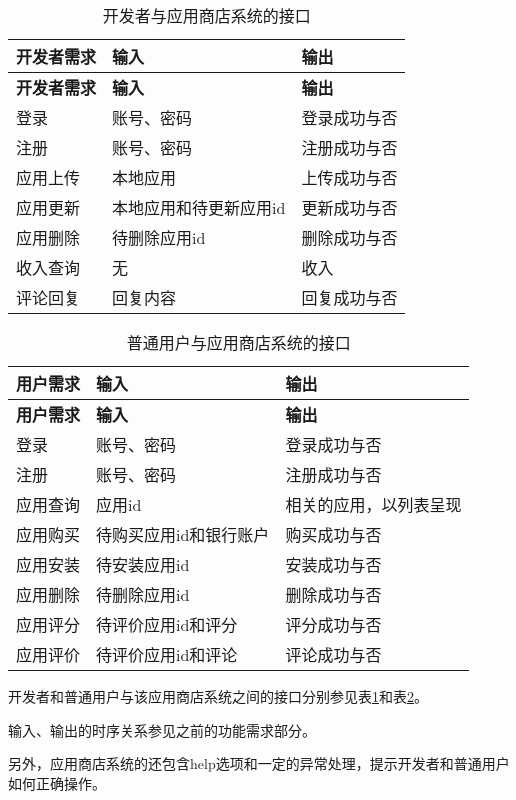 \begin{longtable}{|p{4cm}|p{7cm}|p{7cm}|}
	\caption{开发者与应用商店系统的接口}\label{tab:developer_interface} \\
	\hline
	\textbf{开发者需求} & \textbf{输入} & \textbf{输出}\\
	\hline
	\endfirsthead
	\hline
	\textbf{开发者需求} & \textbf{输入} & \textbf{输出}\\
	\hline
	\endhead
	\hline 
	\endfoot
	\hline
	\endlastfoot
	登录 & 账号、密码 & 登录成功与否\\
	注册 & 账号、密码 & 注册成功与否\\
	应用上传 & 本地应用 & 上传成功与否\\
	应用更新 & 本地应用和待更新应用id & 更新成功与否\\
	应用删除 & 待删除应用id & 删除成功与否\\
	收入查询 & 无 & 收入\\
	评论回复 & 回复内容 & 回复成功与否\\
	\end{longtable}

\begin{longtable}{|p{4cm}|p{7cm}|p{7cm}|}
	\caption{普通用户与应用商店系统的接口}\label{tab:client_interface} \\
	\hline
	\textbf{用户需求} & \textbf{输入} & \textbf{输出}\\
	\hline
	\endfirsthead
	\hline
	\textbf{用户需求} & \textbf{输入} & \textbf{输出}\\
	\hline
	\endhead
	\hline 
	\endfoot
	\hline
	\endlastfoot
	登录 & 账号、密码 & 登录成功与否\\
	注册 & 账号、密码 & 注册成功与否\\
	应用查询 & 应用id & 相关的应用，以列表呈现\\
	应用购买 & 待购买应用id和银行账户 & 购买成功与否\\
	应用安装 & 待安装应用id & 安装成功与否\\
    应用删除 & 待删除应用id & 删除成功与否\\
	应用评分 & 待评价应用id和评分 & 评分成功与否\\
	应用评价 & 待评价应用id和评论 & 评论成功与否\\
	\end{longtable}
开发者和普通用户与该应用商店系统之间的接口分别参见表\ref{tab:developer_interface}和表\ref{tab:client_interface}。

输入、输出的时序关系参见之前的功能需求部分。

另外，应用商店系统的还包含help选项和一定的异常处理，提示开发者和普通用户如何正确操作。

